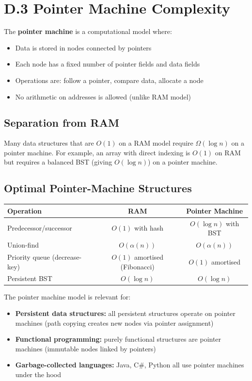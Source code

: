 \section{D.3 Pointer Machine Complexity}
\label{sec:pointer-machine}

The \textbf{pointer machine} is a computational model where:
\begin{itemize}
    \item Data is stored in nodes connected by pointers
    \item Each node has a fixed number of pointer fields and data fields
    \item Operations are: follow a pointer, compare data, allocate a node
    \item No arithmetic on addresses is allowed (unlike RAM model)
\end{itemize}

\subsection{Separation from RAM}

Many data structures that are $O(1)$ on a RAM model require $\Omega(\log n)$ on a pointer machine. For example, an array with direct indexing is $O(1)$ on RAM but requires a balanced BST (giving $O(\log n)$) on a pointer machine.

\subsection{Optimal Pointer-Machine Structures}

\begin{center}
\begin{tabular}{lcc}
\toprule
Operation & RAM & Pointer Machine \\
\midrule
Predecessor/successor & $O(1)$ with hash & $O(\log n)$ with BST \\
Union-find & $O(\alpha(n))$ & $O(\alpha(n))$ \\
Priority queue (decrease-key) & $O(1)$ amortised (Fibonacci) & $O(1)$ amortised \\
Persistent BST & $O(\log n)$ & $O(\log n)$ \\
\bottomrule
\end{tabular}
\end{center}

The pointer machine model is relevant for:
\begin{itemize}
    \item \textbf{Persistent data structures:} all persistent structures operate on pointer machines (path copying creates new nodes via pointer assignment)
    \item \textbf{Functional programming:} purely functional structures are pointer machines (immutable nodes linked by pointers)
    \item \textbf{Garbage-collected languages:} Java, C\#, Python all use pointer machines under the hood
\end{itemize}

